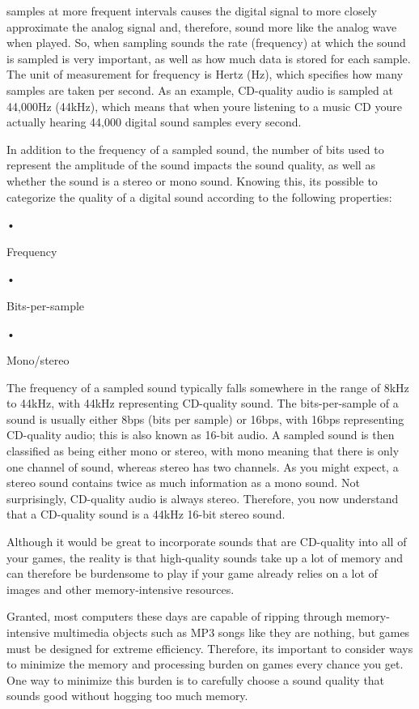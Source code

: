 \documentclass[
]{article}
\begin{document}
samples at more frequent intervals causes the digital signal to more
closely approximate the analog signal and, therefore, sound more like
the analog wave when played. So, when sampling sounds the rate
(frequency) at which the sound is sampled is very important, as well as
how much data is stored for each sample. The unit of measurement for
frequency is Hertz (Hz), which specifies how many samples are taken per
second. As an example, CD-quality audio is sampled at 44,000Hz (44kHz),
which means that when you\textquotesingle re listening to a music CD
you\textquotesingle re actually hearing 44,000 digital sound samples
every second.

In addition to the frequency of a sampled sound, the number of bits used
to represent the amplitude of the sound impacts the sound quality, as
well as whether the sound is a stereo or mono sound. Knowing this,
it\textquotesingle s possible to categorize the quality of a digital
sound according to the following properties:

•

Frequency

•

Bits-per-sample

•

Mono/stereo

The frequency of a sampled sound typically falls somewhere in the range
of 8kHz to 44kHz, with 44kHz representing CD-quality sound. The
bits-per-sample of a sound is usually either 8bps (bits per sample) or
16bps, with 16bps representing CD-quality audio; this is also known as
16-bit audio. A sampled sound is then classified as being either mono or
stereo, with mono meaning that there is only one channel of sound,
whereas stereo has two channels. As you might expect, a stereo sound
contains twice as much information as a mono sound. Not surprisingly,
CD-quality audio is always stereo. Therefore, you now understand that a
CD-quality sound is a 44kHz 16-bit stereo sound.

Although it would be great to incorporate sounds that are CD-quality
into all of your games, the reality is that high-quality sounds take up
a lot of memory and can therefore be burdensome to play if your game
already relies on a lot of images and other memory-intensive resources.

Granted, most computers these days are capable of ripping through
memory-intensive multimedia objects such as MP3 songs like they are
nothing, but games must be designed for extreme efficiency. Therefore,
it\textquotesingle s important to consider ways to minimize the memory
and processing burden on games every chance you get. One way to minimize
this burden is to carefully choose a sound quality that sounds good
without hogging too much memory.
\end{document}
